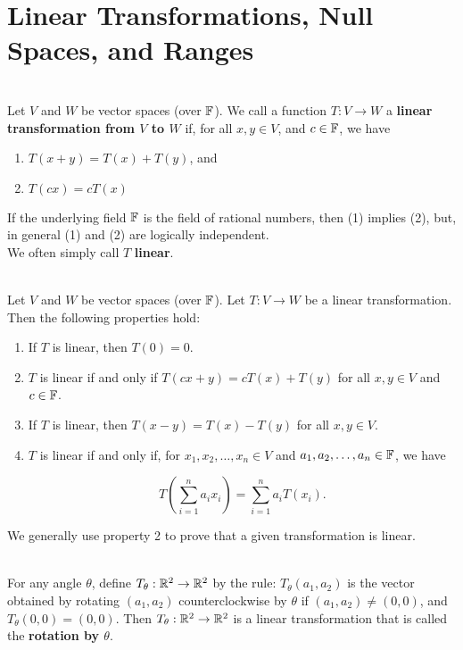 \section{Linear Transformations, Null Spaces, and Ranges}

\begin{definition}
	\hfill\\
	Let $V$ and $W$ be vector spaces (over $\mathbb{F}$). We call a function $T: V \to W$ a \textbf{linear transformation from $V$ to $W$} if, for all $x,y \in V$, and $c \in \mathbb{F}$, we have

	\begin{enumerate}
		\item $T(x + y) = T(x) + T(y)$, and
		\item $T(cx) = cT(x)$
	\end{enumerate}

	If the underlying field $\mathbb{F}$ is the field of rational numbers, then (1) implies (2), but, in general (1) and (2) are logically independent.\\

	We often simply call $T$ \textbf{linear}.
\end{definition}

\begin{remark}
	\hfill\\
	Let $V$ and $W$ be vector spaces (over $\mathbb{F}$). Let $T: V \to W$ be a linear transformation. Then the following properties hold:

	\begin{enumerate}
		\item If $T$ is linear, then $T(0) = 0$.
		\item $T$ is linear if and only if $T(cx + y) = cT(x) + T(y)$ for all $x,y \in V$ and $c \in \mathbb{F}$.
		\item If $T$ is linear, then $T(x-y)=T(x)-T(y)$ for all $x,y \in V$.
		\item $T$ is linear if and only if, for $x_1, x_2, \dots, x_n \in V$ and $a_1, a_2, \dots, a_n \in \mathbb{F}$, we have

		      \[T\left(\sum_{i=1}^{n}a_ix_i\right)=\sum_{i=1}^{n}a_iT(x_i).\]
	\end{enumerate}

	We generally use property 2 to prove that a given transformation is linear.
\end{remark}

\begin{definition}
	\hfill\\
	For any angle $\theta$, define $T_\theta: \mathbb{R}^2 \to \mathbb{R}^2$ by the rule: $T_\theta(a_1, a_2)$ is the vector obtained by rotating $(a_1, a_2)$ counterclockwise by $\theta$ if $(a_1, a_2) \neq (0, 0)$, and $T_\theta(0,0) = (0,0)$. Then $T_\theta: \mathbb{R}^2 \to \mathbb{R}^2$ is a linear transformation that is called the \textbf{rotation by $\theta$}.
\end{definition}

